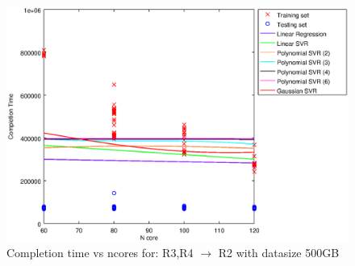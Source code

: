 
\begin {figure}[hbtp]
\centering
\includegraphics[width=\textwidth]{output/R3_R4_VS_R2_500_ALL_FEATURES/plot_R3_R4_VS_R2_500.eps}
\caption{Completion time vs ncores for: R3,R4 $\rightarrow$ R2 with datasize 500GB}
\label{fig:coreonly_linear_R3,R4_R2_500}
\end {figure}
